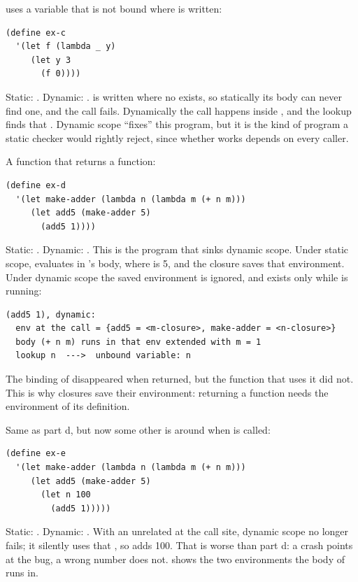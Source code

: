 \begin{exercise}
 uses a variable  that is not bound where  is written:
\begin{lstlisting}
(define ex-c
  '(let f (lambda _ y)
     (let y 3
       (f 0))))
\end{lstlisting}
\end{exercise}
\begin{solution}
Static: . Dynamic: .  is written where no  exists, so statically its body can never find one, and the call fails. Dynamically the call happens inside , and the lookup finds that . Dynamic scope ``fixes'' this program, but it is the kind of program a static checker would rightly reject, since whether  works depends on every caller.
\end{solution}

\begin{exercise}
A function that returns a function:
\begin{lstlisting}
(define ex-d
  '(let make-adder (lambda n (lambda m (+ n m)))
     (let add5 (make-adder 5)
       (add5 1))))
\end{lstlisting}
\end{exercise}
\begin{solution}
Static: . Dynamic: . This is the program that sinks dynamic scope. Under static scope,  evaluates  in 's body, where  is 5, and the closure saves that environment. Under dynamic scope the saved environment is ignored, and  exists only while  is running:
\begin{lstlisting}[style=repl]
(add5 1), dynamic:
  env at the call = {add5 = <m-closure>, make-adder = <n-closure>}
  body (+ n m) runs in that env extended with m = 1
  lookup n  --->  unbound variable: n
\end{lstlisting}
The binding of  disappeared when  returned, but the function that uses it did not. This is why closures save their environment: returning a function needs the environment of its definition.
\end{solution}

\begin{exercise}
Same as part d, but now some other  is around when  is called:
\begin{lstlisting}
(define ex-e
  '(let make-adder (lambda n (lambda m (+ n m)))
     (let add5 (make-adder 5)
       (let n 100
         (add5 1)))))
\end{lstlisting}
\end{exercise}
\begin{solution}
Static: . Dynamic: . With an unrelated  at the call site, dynamic scope no longer fails; it silently uses that , so  adds 100. That is worse than part d: a crash points at the bug, a wrong number does not.  shows the two environments the body of  runs in.
\end{solution}

